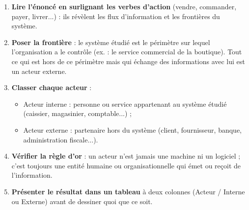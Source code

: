\documentclass[11pt]{article}
\newcommand{\cle}[1]{{\popxbold\color{popdark}#1}}
\begin{document}
\begin{methode}
\begin{enumerate}
\item \textbf{Lire l'énoncé en surlignant les verbes d'action} (vendre, commander, payer, livrer...) : ils révèlent les flux d'information et les frontières du système.
\item \textbf{Poser la frontière} : le système étudié est le périmètre sur lequel l'organisation a le contrôle (ex. : le service commercial de la boutique). Tout ce qui est hors de ce périmètre mais qui échange des informations avec lui est un \cle{acteur externe}.
\item \textbf{Classer chaque acteur} :
\begin{itemize}
\item \cle{Acteur interne} : personne ou service appartenant au système étudié (caissier, magasinier, comptable...) ;
\item \cle{Acteur externe} : partenaire hors du système (client, fournisseur, banque, administration fiscale...).
\end{itemize}
\item \textbf{Vérifier la règle d'or} : un acteur n'est jamais une machine ni un logiciel ; c'est toujours une entité humaine ou organisationnelle qui émet ou reçoit de l'information.
\item \textbf{Présenter le résultat dans un tableau} à deux colonnes (Acteur / Interne ou Externe) avant de dessiner quoi que ce soit.
\end{enumerate}
\end{methode}
\end{document}
